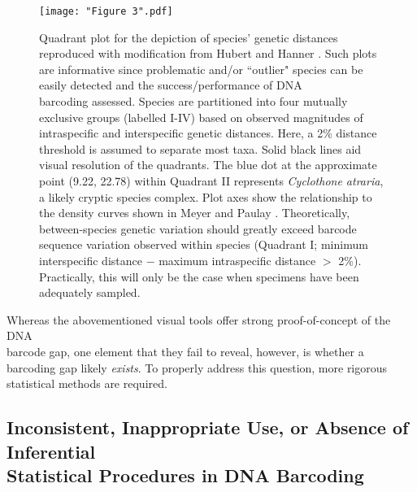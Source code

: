 \begin{figure}[H]

\centering

\texttt{[image: "Figure 3".pdf]}

\caption[Depiction of species' genetic distances as an altered quadrant plot taken from Hubert and Hanner \cite{hubert2015dna}.]
{Quadrant plot for the depiction of species' genetic distances reproduced with modification from Hubert and Hanner \cite{hubert2015dna}. Such plots are informative since problematic and/or ``outlier" species can be easily detected and the success/performance of DNA \\ barcoding assessed. Species are partitioned into four mutually exclusive groups (labelled I-IV) based on observed magnitudes of intraspecific and interspecific genetic distances. Here, a 2\% distance threshold is assumed to separate most taxa. Solid black lines aid visual resolution of the quadrants. The blue dot at the approximate point (9.22, 22.78) within Quadrant II represents \textit{Cyclothone atraria}, a likely cryptic species complex. Plot axes show the relationship to the density curves shown in Meyer and Paulay \cite{meyer2005dna}.  Theoretically, between-species genetic variation should greatly exceed barcode sequence variation observed within species (Quadrant I; minimum interspecific distance $-$ maximum intraspecific distance $>$ 2\%). Practically, this will only be the case when specimens have been adequately sampled.}

\end{figure}


Whereas the abovementioned visual tools offer strong proof-of-concept of the DNA \\ barcode gap, one element that they fail to reveal, however, is whether a barcoding gap likely \textit{exists}. To properly address this question, more rigorous statistical methods are required.


\subsection{Inconsistent, Inappropriate Use, or Absence of Inferential \\ Statistical Procedures in DNA Barcoding}

